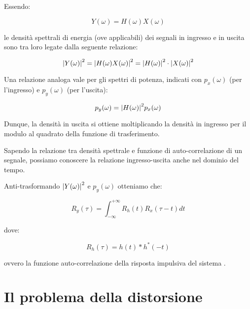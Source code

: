 Essendo: 

{
    \Large 
    \begin{equation}
        Y(\omega) = H(\omega) X(\omega)
    \end{equation}
}

le densità spettrali di energia (ove applicabili) dei segnali in ingresso e in uscita sono tra 
loro legate dalla seguente relazione: 

{
    \Large 
    \begin{equation}
        \abs{Y(\omega)} ^{2} 
        = 
        \abs{H(\omega) X(\omega)} ^{2} 
        = 
        \abs{H(\omega)} ^{2} \cdot \abs{X(\omega)} ^{2}
    \end{equation}
}

Una relazione analoga vale per gli spettri di potenza, indicati con $p_x (\omega)$ 
(per l'ingresso) e $p_y (\omega)$ (per l'uscita): 

{
    \Large 
    \begin{equation}
        p_y (\omega) = \abs{H(\omega)} ^{2} p_x (\omega)
    \end{equation}
}

Dunque, la densità in uscita si ottiene moltiplicando la densità in ingresso 
per il modulo al quadrato della funzione di trasferimento. \newline 

Sapendo la relazione tra densità spettrale e funzione di auto-correlazione di un segnale, possiamo 
conoscere la relazione ingresso-uscita anche nel dominio del tempo. \newline 

Anti-trasformando $\abs{Y(\omega)} ^{2}$ e $p_y (\omega)$ otteniamo che: 

{
    \Large 
    \begin{equation}
        R_y (\tau) 
        = 
        \int_{-\infty}^{+ \infty}
        R_h (t) R_x (\tau - t) dt  
    \end{equation}
}

dove: 

{
    \Large 
    \begin{equation}
        R_h (\tau) = h(t) * h^{*} (-t)
    \end{equation}
}

ovvero la funzione auto-correlazione della risposta impulsiva del sistema .\newline 

\newpage 

\section{Il problema della distorsione} 

